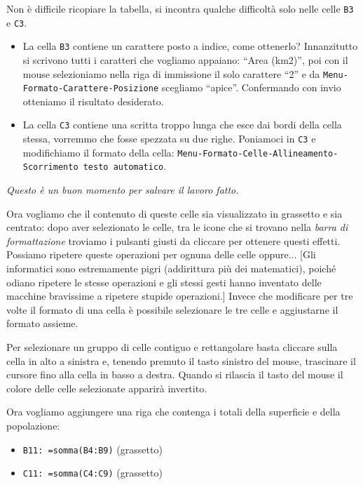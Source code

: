 Non è difficile ricopiare la tabella, si incontra qualche
difficoltà solo nelle celle \texttt{B3} e \texttt{C3}.

\begin{itemize} [noitemsep]
\item 
La cella \texttt{B3} contiene un carattere posto a indice, come ottenerlo?
Innanzitutto si scrivono tutti i caratteri che vogliamo appaiano:
``Area (km2)'', poi con il mouse selezioniamo nella riga di immissione
il solo carattere ``2'' e da \texttt{Menu-Formato-Carattere-Posizione} scegliamo
``apice''. Confermando con invio otteniamo il risultato desiderato.
\item 
La cella \texttt{C3} contiene una scritta troppo lunga che esce dai bordi della
cella stessa, vorremmo che fosse spezzata su due righe. Poniamoci in \texttt{C3}
e modifichiamo il formato della cella:
\texttt{Menu-Formato-Celle-Allineamento-Scorrimento testo automatico}.
\end{itemize}

\emph{Questo è un buon momento per salvare il lavoro fatto.}

Ora vogliamo che il contenuto di queste celle sia visualizzato in grassetto
e sia centrato: dopo aver selezionato le celle, tra le icone che si trovano
nella \emph{barra di formattazione} troviamo i pulsanti giusti da cliccare per
ottenere questi effetti.
Possiamo ripetere queste operazioni per ognuna delle celle oppure...
{[}Gli informatici sono estremamente pigri (addirittura più dei matematici),
poiché odiano ripetere le stesse operazioni e gli stessi gesti hanno
inventato delle macchine bravissime a ripetere stupide operazioni.{]}
Invece che modificare per tre volte il formato di una cella è possibile
selezionare le tre celle e aggiustarne il formato assieme.

Per selezionare un gruppo di celle contiguo e rettangolare basta cliccare
sulla cella in alto a sinistra e, tenendo premuto il tasto sinistro del
mouse, trascinare il cursore fino alla cella in basso a destra.
Quando si rilascia il tasto del mouse il colore delle celle selezionate
apparirà invertito.

Ora vogliamo aggiungere una riga che contenga i totali della superficie e
della popolazione:

\begin{itemize} [noitemsep]
\item \texttt{B11: =somma(B4:B9)} (grassetto)
\item \texttt{C11: =somma(C4:C9)} (grassetto)
\end{itemize}

